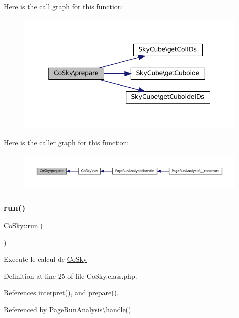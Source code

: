 Here is the call graph for this function\+:\nopagebreak
\begin{figure}[H]
\begin{center}
\leavevmode
\includegraphics[width=338pt]{class_co_sky_a66c49b4768ec95a9d5b34e3de4a96811_cgraph}
\end{center}
\end{figure}
Here is the caller graph for this function\+:\nopagebreak
\begin{figure}[H]
\begin{center}
\leavevmode
\includegraphics[width=350pt]{class_co_sky_a66c49b4768ec95a9d5b34e3de4a96811_icgraph}
\end{center}
\end{figure}
\mbox{\label{class_co_sky_acd57d18650f195f38f620762d8e6feae}} 
\subsubsection{\texorpdfstring{run()}{run()}}
{\footnotesize\ttfamily Co\+Sky\+::run (\begin{DoxyParamCaption}{ }\end{DoxyParamCaption})}

Execute le calcul de \hyperlink{class_co_sky}{Co\+Sky} 

Definition at line 25 of file Co\+Sky.\+class.\+php.



References interpret(), and prepare().



Referenced by Page\+Run\+Analysis\textbackslash{}handle().

